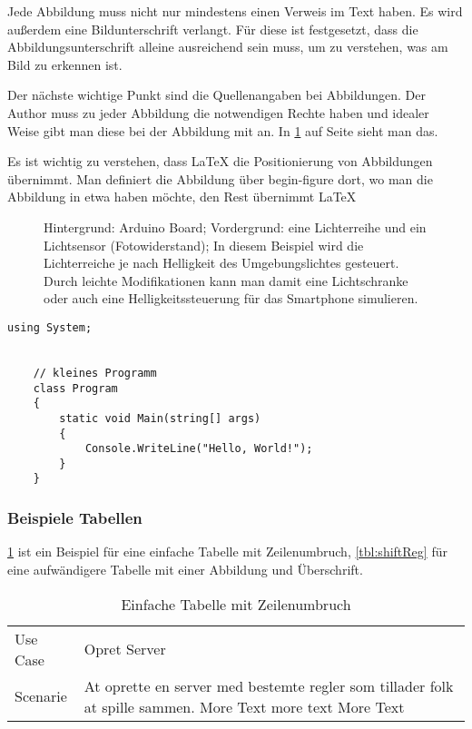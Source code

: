 Jede Abbildung muss nicht nur mindestens einen Verweis im Text haben. Es wird außerdem eine Bildunterschrift verlangt. Für diese ist festgesetzt, dass die Abbildungsunterschrift alleine ausreichend sein muss, um zu verstehen, was am Bild zu erkennen ist.

Der nächste wichtige Punkt sind die Quellenangaben bei Abbildungen. Der Author muss zu jeder Abbildung die notwendigen Rechte haben und idealer Weise gibt man diese bei der Abbildung mit an. In \cref{fig:ArduExample} auf Seite \pageref{fig:ArduExample} sieht man das.

Es ist wichtig zu verstehen, dass \LaTeX{} die Positionierung von Abbildungen übernimmt. Man definiert die Abbildung über begin-figure dort, wo man die Abbildung in etwa haben  möchte, den Rest übernimmt \LaTeX{}

\begin{figure}[t]
	\centering
	\caption[Arduino mit Lichtsensor und Lichterkette]{Hintergrund: Arduino Board;
		Vordergrund: eine Lichterreihe und ein Lichtsensor (Fotowiderstand); In diesem
		Beispiel wird die Lichterreiche je nach Helligkeit des Umgebungslichtes
		gesteuert. Durch leichte Modifikationen kann man damit eine Lichtschranke oder
		auch eine Helligkeitssteuerung für das Smartphone simulieren.}
	\label{fig:ArduExample}
\end{figure}

\begin{lstlisting}[style=csharp]
	using System;
	
	
	// kleines Programm
	class Program
	{
		static void Main(string[] args)
		{
			Console.WriteLine("Hello, World!");
		}
	}
\end{lstlisting}

\subsubsection{Beispiele Tabellen}

\cref{tbl:lineBreak} ist ein Beispiel für eine einfache Tabelle mit
Zeilenumbruch, \cref{tbl:shiftReg} für eine aufwändigere Tabelle mit einer
Abbildung und Überschrift.

\begin{table}[h]
	\begin{tabularx}{\textwidth}{|l|X|}
		Use Case & Opret Server                                                                                               \\
		Scenarie & At oprette en server med bestemte regler som tillader folk at spille sammen. More Text more text More Text \\
	\end{tabularx}
	\caption{Einfache Tabelle mit Zeilenumbruch}
	\label{tbl:lineBreak}
\end{table}

